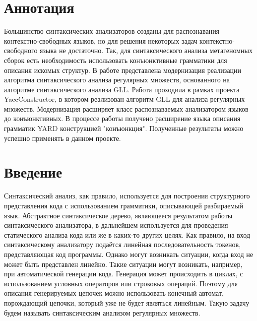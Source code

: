\documentclass[14pt]{matmex-diploma}
\begin{document}
\maketitle
\tableofcontents


\section*{Аннотация}

Большинство синтаксических анализаторов созданы для распознавания контекстно-свободных языков, но для решения некоторых задач контекстно-свободного языка не достаточно. Так, для синтаксического анализа метагеномных сборок есть необходимость использовать конъюнктивные грамматики для описания искомых структур. В работе представлена модернизация реализации алгоритма синтаксического анализа регулярных множеств, основанного на алгоритме синтаксического анализа GLL. Работа проходила в рамках проекта YaccConstructor, в котором реализован алгоритм GLL для анализа регулярных множеств. Модернизация расширяет класс распознаваемых анализатором языков до конъюнктивных. В процессе работы получено расширение языка описания грамматик YARD конструкцией "конъюнкция". Полученные результаты можно успешно применять в данном проекте.

\section*{Введение}

Синтаксический анализ, как правило, используется для построения структурного представления кода с использованием грамматики, описывающей разбираемый язык. Абстрактное синтаксическое дерево, являющееся результатом работы синтаксического анализатора, в дальнейшем используется для проведения статического анализа кода или же в каких-то других целях. Как правило, на вход синтаксическому анализатору подаётся линейная последовательность токенов, представляющая код программы. Однако могут возникать ситуации, когда вход не может быть представлен линейно. Такие ситуации могут возникать, например, при автоматической генерации кода. Генерация может происходить в циклах, с использованием условных операторов или строковых операций. Поэтому для описания генерируемых цепочек можно использовать конечный автомат, порождающий цепочки, который уже не будет являться линейным. Такую задачу будем называть синтаксическим анализом регулярных множеств.
\end{document}
